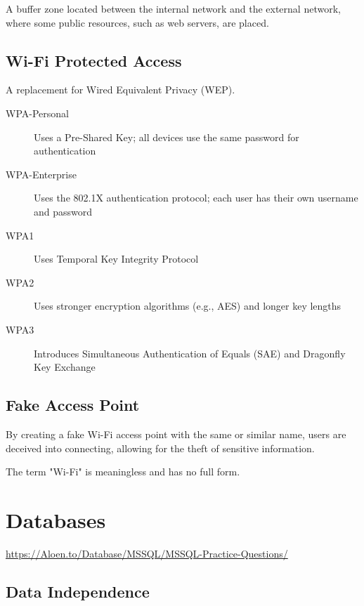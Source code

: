 \documentclass[11pt,journal,compsoc]{IEEEtran}
\begin{document}
A buffer zone located between the internal network and the external network, where some public resources, such as web servers, are placed.


\subsection{Wi-Fi Protected Access}

A replacement for Wired Equivalent Privacy (WEP).

\begin{description}
    \item[WPA-Personal] Uses a Pre-Shared Key; all devices use the same password for authentication

    \item[WPA-Enterprise] Uses the 802.1X authentication protocol; each user has their own username and password
\end{description}

\begin{description}
    \item[WPA1] Uses Temporal Key Integrity Protocol

    \item[WPA2] Uses stronger encryption algorithms (e.g., AES) and longer key lengths

    \item[WPA3] Introduces Simultaneous Authentication of Equals (SAE) and Dragonfly Key Exchange
\end{description}


\subsection{Fake Access Point}

By creating a fake Wi-Fi access point with the same or similar name, users are deceived into connecting, allowing for the theft of sensitive information.

The term "Wi-Fi" is meaningless and has no full form.

\section{Databases}

\url{https://Aloen.to/Database/MSSQL/MSSQL-Practice-Questions/}

\subsection{Data Independence}
\end{document}
